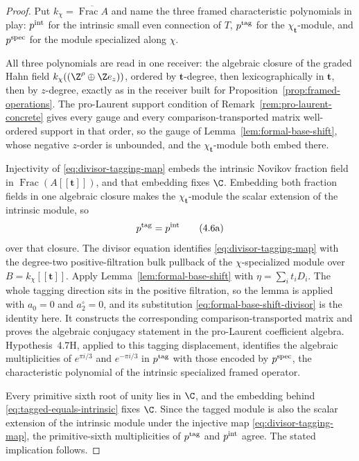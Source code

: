 \begin{proof}
Put \(k_\chi=\overline{\operatorname{Frac}A}\) and name the three framed
characteristic polynomials in play: \(p^{\rm int}\) for the intrinsic small
even connection of \(T\), \(p^{\rm tag}\) for the
\(\chi_{\boldsymbol t}\)-module, and \(p^{\rm spec}\) for the module
specialized along \(\chi\).

All three polynomials are read in one receiver: the algebraic closure of the
graded Hahn field \(k_\chi((\Z^\rho\oplus\Z e_z))\), ordered by
\(\boldsymbol t\)-degree, then lexicographically in \(\boldsymbol t\), then
by \(z\)-degree, exactly as in the receiver built for
Proposition~\ref{prop:framed-operations}.  The pro-Laurent support condition
of Remark~\ref{rem:pro-laurent-concrete} gives every gauge and every
comparison-transported matrix well-ordered support in that order, so the gauge of
Lemma~\ref{lem:formal-base-shift}, whose negative \(z\)-order is unbounded,
and the \(\chi_{\boldsymbol t}\)-module both embed there.

Injectivity of \eqref{eq:divisor-tagging-map} embeds the intrinsic Novikov
fraction field in \(\operatorname{Frac}(A[[\boldsymbol t]])\), and that
embedding fixes \(\C\).  Embedding both fraction fields in one algebraic
closure makes the \(\chi_{\boldsymbol t}\)-module the scalar extension of the
intrinsic module, so
\[
 p^{\rm tag}=p^{\rm int}
 \tag{4.6a}
 \label{eq:tagged-equals-intrinsic}
\]
over that closure.  The divisor equation identifies
\eqref{eq:divisor-tagging-map} with the degree-two positive-filtration bulk
pullback of the \(\chi\)-specialized module over
\(B=k_\chi[[\boldsymbol t]]\).  Apply
Lemma~\ref{lem:formal-base-shift} with \(\eta=\sum_i t_iD_i\).  The whole
tagging direction sits in the positive filtration, so the lemma is applied
with \(a_0=0\) and \(a_2^\circ=0\), and its substitution
\eqref{eq:formal-base-shift-divisor} is the identity here.  It constructs the
corresponding comparison-transported matrix and proves the algebraic
conjugacy statement in the pro-Laurent coefficient algebra.  Hypothesis~4.7H,
applied to this tagging displacement, identifies the algebraic multiplicities
of \(e^{\pi i/3}\) and \(e^{-\pi i/3}\) in \(p^{\rm tag}\) with those encoded
by \(p^{\rm spec}\), the characteristic polynomial of the intrinsic
specialized framed operator.

Every primitive sixth root of unity lies in \(\C\), and the embedding behind
\eqref{eq:tagged-equals-intrinsic} fixes \(\C\).  Since the tagged module is
also the scalar extension of the intrinsic module under the injective map
\eqref{eq:divisor-tagging-map}, the primitive-sixth multiplicities of
\(p^{\rm tag}\) and \(p^{\rm int}\) agree.  The stated implication follows.


\end{proof}
